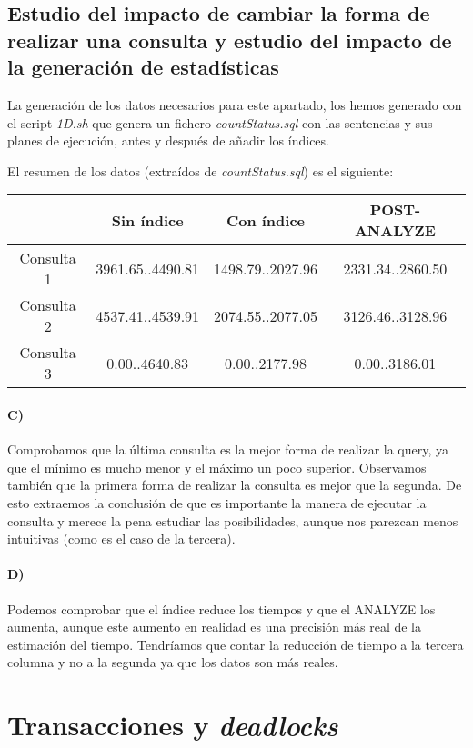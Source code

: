 \documentclass{article}
\begin{document}
\subsection{Estudio del impacto de cambiar la forma de realizar una consulta y estudio del impacto de la generación de estadísticas}


La generación de los datos necesarios para este apartado, los hemos generado con el script \textit{1D.sh} que genera un fichero \textit{countStatus.sql} con las sentencias y sus planes de ejecución, antes y después de añadir los índices.

El resumen de los datos (extraídos de \textit{countStatus.sql}) es el siguiente:

\begin{tabular}{c|c|c|c}
& Sin índice & Con índice & POST-ANALYZE \\\hline
Consulta 1 & 3961.65..4490.81 & 1498.79..2027.96& 2331.34..2860.50\\
Consulta 2 & 4537.41..4539.91 &2074.55..2077.05&3126.46..3128.96\\
Consulta 3 & 0.00..4640.83 & 0.00..2177.98 & 0.00..3186.01
\end{tabular}

\paragraph{C)} Comprobamos que la última consulta es la mejor forma de realizar la query, ya que el mínimo es mucho menor y el máximo un poco superior. Observamos también que la primera forma de realizar la consulta es mejor que la segunda. De esto extraemos la conclusión de que es importante la manera de ejecutar la consulta y merece la pena estudiar las posibilidades, aunque nos parezcan menos intuitivas (como es el caso de la tercera).

\paragraph{D)}
Podemos comprobar que el índice reduce los tiempos y que el ANALYZE los aumenta, aunque este aumento en realidad es una precisión más real de la estimación del tiempo. Tendríamos que contar la reducción de tiempo a la tercera columna y no a la segunda ya que los datos son más reales.


\section{Transacciones y \textit{deadlocks}}
\end{document}
